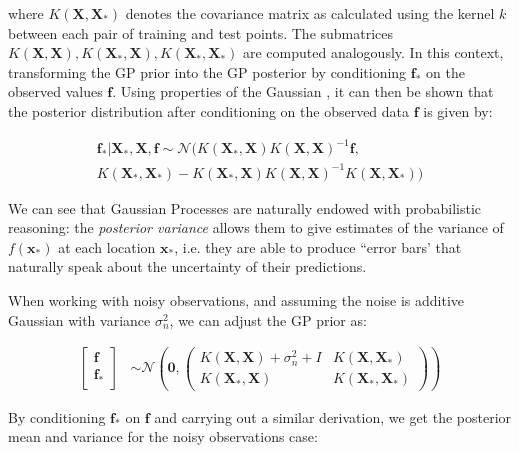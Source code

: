 \documentclass[pdftex,10pt,a4paper,journal]{article}
\theoremstyle{definition}
\theoremstyle{remark}
\newcommand*{\V}[1]{\mathbf{#1}}%
\begin{document}
\begin{multicols}{2}
where $K(\V{X}, \V{X}_*)$ denotes the covariance matrix as calculated using the kernel $k$ between each pair of training and test points. The submatrices $K(\V{X},\V{X}), K(\V{X}_*, \V{X}), K(\V{X}_*, \V{X}_*)$ are computed analogously. In this context, transforming the GP prior into the GP posterior by conditioning $\V{f}_*$ on the observed values $\V{f}$. Using properties of the Gaussian \cite{Rasmussen2006}, it can then be shown that the posterior distribution after conditioning on the observed data $\V{f}$ is given by:

\begin{align*}
    \V{f}_*|\V{X}_*, \V{X}, \V{f} \sim \mathcal{N}(K(\V{X}_*, \V{X})K(\V{X},\V{X})^{-1}\V{f}, \\K(\V{X}_*, \V{X}_*) - K(\V{X}_*, \V{X})K(\V{X}, \V{X})^{-1}K(\V{X}, \V{X}_*))
\end{align*}


\par We can see that Gaussian Processes are naturally endowed with probabilistic reasoning: the \textit{posterior variance} allows them to give estimates of the variance of $f(\V{x}_*)$ at each location $\V{x}_*$, i.e. they are able to produce ``error bars' that naturally speak about the uncertainty of their predictions.

\par When working with noisy observations, and assuming the noise is additive Gaussian with variance $\sigma_n^2$, we can adjust the GP prior as:

\begin{align*}
    \begin{bmatrix}
           \V{f} \\
           \V{f}_* \\
    \end{bmatrix} &\sim \mathcal{N}\left(\V{0}, 
                                        \begin{pmatrix}
                                        K(\V{X}, \V{X}) + \sigma_n^2+I & K(\V{X}, \V{X}_*)\\
                                        K(\V{X}_*, \V{X}) & K(\V{X}_*, \V{X}_*)
                                        \end{pmatrix}\right)
\end{align*}

\par By conditioning $\V{f}_*$ on $\V{f}$ and carrying out a similar derivation, we get the posterior mean and variance for the noisy observations case:


\end{multicols}
\end{document}
